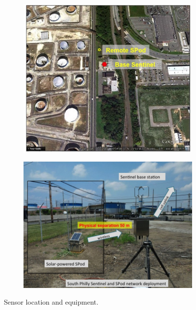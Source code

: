 \documentclass[fontsize=11pt]{scrartcl} %
\begin{document}
\begin{figure}[h!]
	\begin{subfigure}[b]{0.43\textwidth}
		\includegraphics[width=\linewidth]{Slide11}
	\end{subfigure}
	\begin{subfigure}[b]{0.5\textwidth}
		\includegraphics[width=\linewidth]{Slide12}	
	\end{subfigure}	
	\caption{Sensor location and equipment.}
\end{figure}
\end{document}

